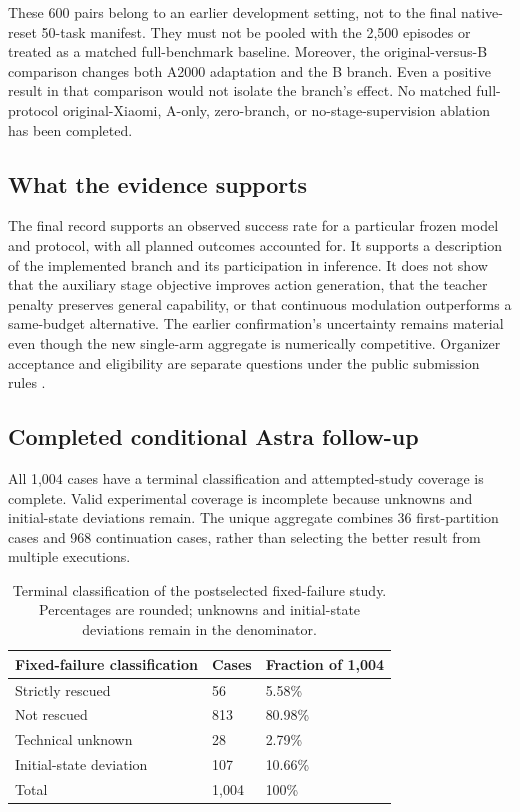 \documentclass[10pt,twocolumn,letterpaper]{article}
\begin{document}
These 600 pairs belong to an earlier development setting, not to the final native-reset 50-task manifest. They must not be pooled with the 2,500 episodes or treated as a matched full-benchmark baseline. Moreover, the original-versus-B comparison changes both A2000 adaptation and the B branch. Even a positive result in that comparison would not isolate the branch's effect. No matched full-protocol original-Xiaomi, A-only, zero-branch, or no-stage-supervision ablation has been completed.


\subsection{What the evidence supports}

The final record supports an observed success rate for a particular frozen model and protocol, with all planned outcomes accounted for. It supports a description of the implemented branch and its participation in inference. It does not show that the auxiliary stage objective improves action generation, that the teacher penalty preserves general capability, or that continuous modulation outperforms a same-budget alternative. The earlier confirmation's uncertainty remains material even though the new single-arm aggregate is numerically competitive. Organizer acceptance and eligibility are separate questions under the public submission rules \cite{r11}.


\subsection{Completed conditional Astra follow-up}

All 1,004 cases have a terminal classification and attempted-study coverage is complete. Valid experimental coverage is incomplete because unknowns and initial-state deviations remain. The unique aggregate combines 36 first-partition cases and 968 continuation cases, rather than selecting the better result from multiple executions.


\begin{table}[ht]\centering\footnotesize\begin{tabularx}{\columnwidth}{@{}XXX@{}}\toprule

Fixed-failure classification & Cases & Fraction of 1,004\\\midrule

Strictly rescued & 56 & 5.58\%\\

Not rescued & 813 & 80.98\%\\

Technical unknown & 28 & 2.79\%\\

Initial-state deviation & 107 & 10.66\%\\

Total & 1,004 & 100\%\\

\bottomrule\end{tabularx}

\caption{Terminal classification of the postselected fixed-failure study. Percentages are rounded; unknowns and initial-state deviations remain in the denominator.}\end{table}
\end{document}
